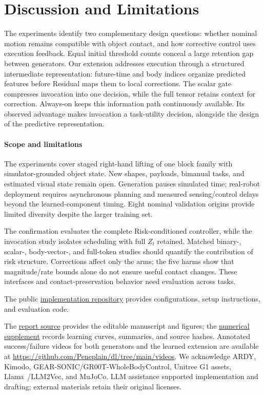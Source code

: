 \documentclass[letterpaper,10pt,conference]{ieeeconf}
\begin{document}
\section{Discussion and Limitations}
The experiments identify two complementary design questions: whether nominal motion remains compatible with object contact, and how corrective control uses execution feedback. Equal initial threshold counts conceal a large retention gap between generators. Our extension addresses execution through a structured intermediate representation: future-time and body indices organize predicted features before Residual maps them to local corrections. The scalar gate compresses invocation into one decision, while the full tensor retains context for correction. Always-on keeps this information path continuously available. Its observed advantage makes invocation a task-utility decision, alongside the design of the predictive representation.

\paragraph{Scope and limitations}
The experiments cover staged right-hand lifting of one block family with simulator-grounded object state. New shapes, payloads, bimanual tasks, and estimated visual state remain open. Generation pauses simulated time; real-robot deployment requires asynchronous planning and measured sensing/control delays beyond the learned-component timing. Eight nominal validation origins provide limited diversity despite the larger training set.

The confirmation evaluates the complete Risk-conditioned controller, while the invocation study isolates scheduling with full $Z_t$ retained. Matched binary-, scalar-, body-vector-, and full-token studies should quantify the contribution of risk structure. Corrections affect only the arms; the five harms show that magnitude/rate bounds alone do not ensure useful contact changes. These interfaces and contact-preservation behavior need evaluation across tasks.


The public \href{https://github.com/Peneplain/dl}{implementation repository} provides configurations, setup instructions, and evaluation code.

The \href{https://github.com/Peneplain/dl/tree/main/report}{report source} provides the editable manuscript and figures; the \href{https://github.com/Peneplain/dl/tree/main/docs/results}{numerical supplement} records learning curves, summaries, and source hashes. Annotated success/failure videos for both generators and the learned extension are available at \url{https://github.com/Peneplain/dl/tree/main/videos}. We acknowledge ARDY, Kimodo, GEAR-SONIC/GR00T-WholeBodyControl, Unitree G1 assets, Llama~\cite{llama3}/LLM2Vec, and MuJoCo. LLM assistance supported implementation and drafting; external materials retain their original licenses.
\end{document}
